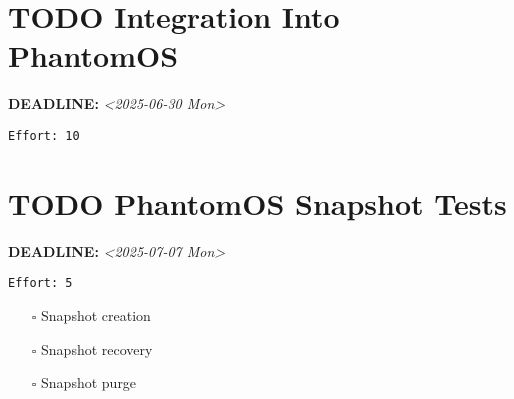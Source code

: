 \documentclass[11pt]{article}
\begin{document}
\section{{\bfseries\sffamily TODO}  Integration Into PhantomOS}
\label{sec:org13194ca}
\noindent\textbf{DEADLINE:} \textit{<2025-06-30 Mon>}\\
\begin{verbatim}
Effort: 10
\end{verbatim}
\section{{\bfseries\sffamily TODO}  PhantomOS Snapshot Tests}
\label{sec:orgb836a2f}
\noindent\textbf{DEADLINE:} \textit{<2025-07-07 Mon>}\\
\begin{verbatim}
Effort: 5
\end{verbatim}
\begin{itemize}
\item[{$\square$}] Snapshot creation
\item[{$\square$}] Snapshot recovery
\item[{$\square$}] Snapshot purge
\end{itemize}
\end{document}
